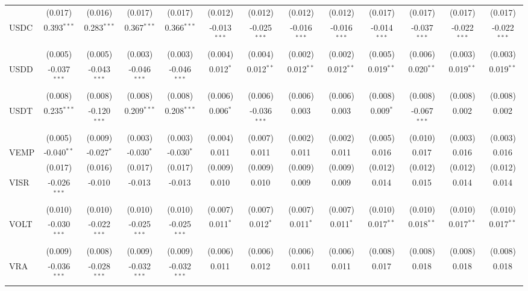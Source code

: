 \begin{table}[!htbp]
\begin{tabular}{@{\extracolsep{5pt}}lcccccccccccc}
  & (0.017) & (0.016) & (0.017) & (0.017) & (0.012) & (0.012) & (0.012) & (0.012) & (0.017) & (0.017) & (0.017) & (0.017) \\
 USDC & 0.393$^{***}$ & 0.283$^{***}$ & 0.367$^{***}$ & 0.366$^{***}$ & -0.013$^{***}$ & -0.025$^{***}$ & -0.016$^{***}$ & -0.016$^{***}$ & -0.014$^{***}$ & -0.037$^{***}$ & -0.022$^{***}$ & -0.022$^{***}$ \\
  & (0.005) & (0.005) & (0.003) & (0.003) & (0.004) & (0.004) & (0.002) & (0.002) & (0.005) & (0.006) & (0.003) & (0.003) \\
 USDD & -0.037$^{***}$ & -0.043$^{***}$ & -0.046$^{***}$ & -0.046$^{***}$ & 0.012$^{*}$ & 0.012$^{**}$ & 0.012$^{**}$ & 0.012$^{**}$ & 0.019$^{**}$ & 0.020$^{**}$ & 0.019$^{**}$ & 0.019$^{**}$ \\
  & (0.008) & (0.008) & (0.008) & (0.008) & (0.006) & (0.006) & (0.006) & (0.006) & (0.008) & (0.008) & (0.008) & (0.008) \\
 USDT & 0.235$^{***}$ & -0.120$^{***}$ & 0.209$^{***}$ & 0.208$^{***}$ & 0.006$^{*}$ & -0.036$^{***}$ & 0.003$^{}$ & 0.003$^{}$ & 0.009$^{*}$ & -0.067$^{***}$ & 0.002$^{}$ & 0.002$^{}$ \\
  & (0.005) & (0.009) & (0.003) & (0.003) & (0.004) & (0.007) & (0.002) & (0.002) & (0.005) & (0.010) & (0.003) & (0.003) \\
 VEMP & -0.040$^{**}$ & -0.027$^{*}$ & -0.030$^{*}$ & -0.030$^{*}$ & 0.011$^{}$ & 0.011$^{}$ & 0.011$^{}$ & 0.011$^{}$ & 0.016$^{}$ & 0.017$^{}$ & 0.016$^{}$ & 0.016$^{}$ \\
  & (0.017) & (0.016) & (0.017) & (0.017) & (0.009) & (0.009) & (0.009) & (0.009) & (0.012) & (0.012) & (0.012) & (0.012) \\
 VISR & -0.026$^{***}$ & -0.010$^{}$ & -0.013$^{}$ & -0.013$^{}$ & 0.010$^{}$ & 0.010$^{}$ & 0.009$^{}$ & 0.009$^{}$ & 0.014$^{}$ & 0.015$^{}$ & 0.014$^{}$ & 0.014$^{}$ \\
  & (0.010) & (0.010) & (0.010) & (0.010) & (0.007) & (0.007) & (0.007) & (0.007) & (0.010) & (0.010) & (0.010) & (0.010) \\
 VOLT & -0.030$^{***}$ & -0.022$^{***}$ & -0.025$^{***}$ & -0.025$^{***}$ & 0.011$^{*}$ & 0.012$^{*}$ & 0.011$^{*}$ & 0.011$^{*}$ & 0.017$^{**}$ & 0.018$^{**}$ & 0.017$^{**}$ & 0.017$^{**}$ \\
  & (0.009) & (0.008) & (0.009) & (0.009) & (0.006) & (0.006) & (0.006) & (0.006) & (0.008) & (0.008) & (0.008) & (0.008) \\
 VRA & -0.036$^{***}$ & -0.028$^{***}$ & -0.032$^{***}$ & -0.032$^{***}$ & 0.011$^{}$ & 0.012$^{}$ & 0.011$^{}$ & 0.011$^{}$ & 0.017$^{}$ & 0.018$^{}$ & 0.018$^{}$ & 0.018$^{}$ \\

\end{tabular}
\end{table}
